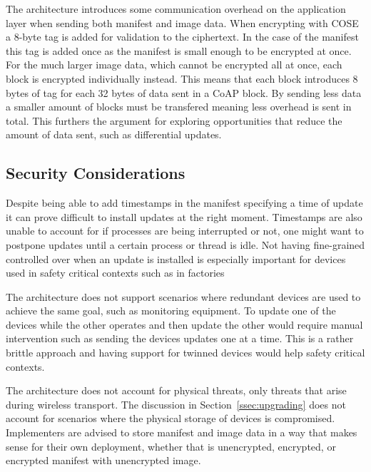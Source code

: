\documentclass[0-thesis.tex]{subfiles}
\begin{document}
The architecture introduces some communication overhead on the application layer when
sending both manifest and image data. When encrypting with COSE a 8-byte tag is added for
validation to the ciphertext. In the case of the manifest this tag is added once as the
manifest is small enough to be encrypted at once. For the much larger image data, which
cannot be encrypted all at once, each block is encrypted individually instead. This means
that each block introduces 8 bytes of tag for each 32 bytes of data sent in a CoAP block.
By sending less data a smaller amount of blocks must be transfered meaning less overhead
is sent in total. This furthers the argument for exploring opportunities that reduce the
amount of data sent, such as differential updates.

\subsection{Security Considerations}
\label{ssec:security-considerations}
Despite being able to add timestamps in the manifest specifying a time of update it can
prove difficult to install updates at the right moment. Timestamps are also unable to
account for if processes are being interrupted or not, one might want to postpone updates
until a certain process or thread is idle. Not having fine-grained controlled over when an
update is installed is especially important for devices used in safety critical contexts
such as in factories

The architecture does not support scenarios where redundant devices are used to achieve
the same goal, such as monitoring equipment. To update one of the devices while the other
operates and then update the other would require manual intervention such as sending the
devices updates one at a time. This is a rather brittle approach and having support for
twinned devices would help safety critical contexts.

The architecture does not account for physical threats, only threats that arise during
wireless transport. The discussion in Section~\ref{ssec:upgrading} does not account for
scenarios where the physical storage of devices is compromised. Implementers are advised
to store manifest and image data in a way that makes sense for their own deployment,
whether that is unencrypted, encrypted, or encrypted manifest with unencrypted image.
\end{document}
